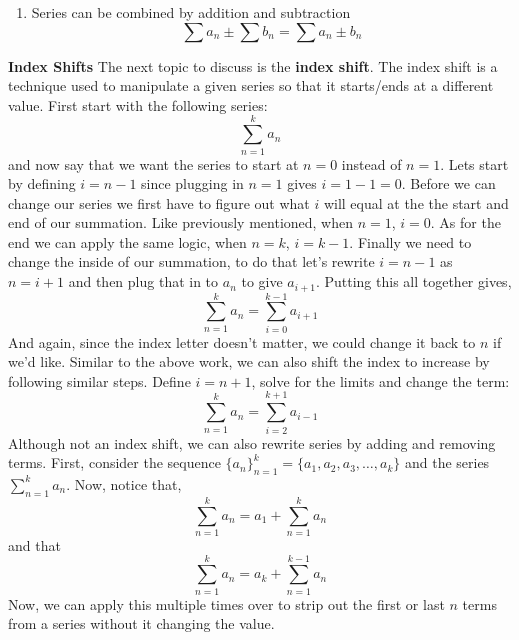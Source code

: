 \documentclass[addpoints]{exam}
\begin{document}
\begin{tcolorbox}[breakable, title=SERIES, colframe=black, sharp corners, colback=white, colbacktitle=white, coltitle=black]
\begin{tcolorbox}[breakable, title=PROPERTIES OF SERIES, colframe=black, sharp corners, colback=white, colbacktitle=white, coltitle=black]
\begin{enumerate}
              \item Series can be combined by addition and subtraction 
                \[
                  \sum a_n \pm \sum b_n = \sum a_n \pm b_n 
                \]
            \end{enumerate}
          \end{tcolorbox}
          \newpage
          \large \textbf{Index Shifts}
          \newline\normalsize The next topic to discuss is the \textbf{index shift}. The index shift is a technique used to manipulate a given series so that it starts/ends at a different value. First start with the following series: 
          \[
            \sum\limits_{n=1}^{k} a_n
          \]
          and now say that we want the series to start at $n=0$ instead of $n=1$. Lets start by defining $i=n-1$ since plugging in $n=1$ gives $i=1-1=0$. Before we can change our series we first have to figure out what $i$ will equal at the the start and end of our summation. Like previously mentioned, when $n=1$, $i=0$. As for the end we can apply the same logic, when $n=k$, $i=k-1$. Finally we need to change the inside of our summation, to do that let's rewrite $i=n-1$ as $n=i+1$ and then plug that in to $a_n$ to give $a_{i+1}$. Putting this all together gives, 
          \[
            \sum\limits_{n=1}^{k} a_n = \sum\limits_{i=0}^{k-1} a_{i+1}
          \]
          And again, since the index letter doesn't matter, we could change it back to $n$ if we'd like. Similar to the above work, we can also shift the index to increase by following similar steps. Define $i=n+1$, solve for the limits and change the term:
          \[
            \sum\limits_{n=1}^{k} a_n = \sum\limits_{i=2}^{k+1} a_{i-1}
          \]
          \newline
          \vspace{0.1in}
          \noindent\makebox[\linewidth]{\hrulefill}
          Although not an index shift, we can also rewrite series by adding and removing terms. First, consider the sequence $\{a_n\}_{n=1}^{k} = \{a_1, a_2, a_3, \ldots, a_k\}$ and the series $\sum\limits_{n=1}^{k} a_n$. Now, notice that, 
          \[
            \sum\limits_{n=1}^{k} a_n = a_1 + \sum\limits_{n=1}^{k} a_n
          \]
          and that 
          \[
            \sum\limits_{n=1}^{k} a_n = a_k + \sum\limits_{n=1}^{k-1} a_n
          \]
          Now, we can apply this multiple times over to strip out the first or last $n$ terms from a series without it changing the value. 
          \newline 

\end{tcolorbox}
\end{document}
